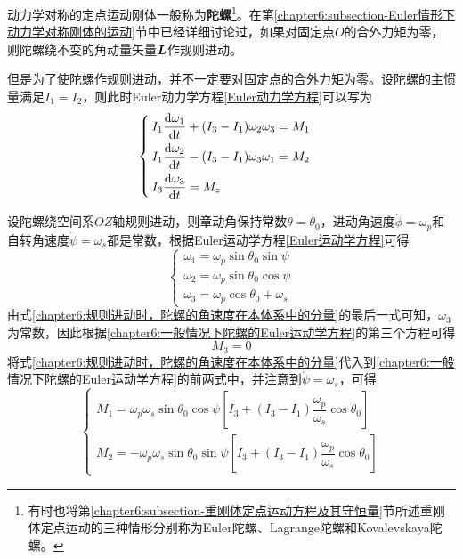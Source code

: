 
动力学对称的定点运动刚体一般称为{\bf 陀螺}\footnote{有时也将第\ref{chapter6:subsection-重刚体定点运动方程及其守恒量}节所述重刚体定点运动的三种情形分别称为Euler陀螺、Lagrange陀螺和Kovalevskaya陀螺。}。在第\ref{chapter6:subsection-Euler情形下动力学对称刚体的运动}节中已经详细讨论过，如果对固定点$O$的合外力矩为零，则陀螺绕不变的角动量矢量$\boldsymbol{L}$作规则进动。

但是为了使陀螺作规则进动，并不一定要对固定点的合外力矩为零。设陀螺的主惯量满足$I_1=I_2$，则此时Euler动力学方程\eqref{Euler动力学方程}可以写为
\begin{equation}
\begin{cases}
	I_1\dfrac{\mathrm{d} \omega_1}{\mathrm{d} t}+(I_3-I_1)\omega_2\omega_3=M_1 \\[1.5ex]
	I_1\dfrac{\mathrm{d} \omega_2}{\mathrm{d} t}-(I_3-I_1)\omega_3\omega_1=M_2 \\[1.5ex]
	I_3\dfrac{\mathrm{d} \omega_3}{\mathrm{d} t}=M_z
\end{cases}
\label{chapter6:一般情况下陀螺的Euler运动学方程}
\end{equation}

设陀螺绕空间系$OZ$轴规则进动，则章动角保持常数$\theta=\theta_0$，进动角速度$\dot{\phi}=\omega_p$和自转角速度$\dot{\psi}=\omega_s$都是常数，根据Euler运动学方程\eqref{Euler运动学方程}可得
\begin{equation}
\begin{cases}
	\omega_1=\omega_p\sin\theta_0\sin\psi \\
	\omega_2=\omega_p\sin\theta_0\cos\psi \\
	\omega_3=\omega_p\cos\theta_0+\omega_s
\end{cases}
\label{chapter6:规则进动时，陀螺的角速度在本体系中的分量}
\end{equation}
由式\eqref{chapter6:规则进动时，陀螺的角速度在本体系中的分量}的最后一式可知，$\omega_3$为常数，因此根据\eqref{chapter6:一般情况下陀螺的Euler运动学方程}的第三个方程可得
\begin{equation}
	M_3=0
	\label{chapter6:规则进动时，陀螺所受合外力矩的z分量}
\end{equation}
将式\eqref{chapter6:规则进动时，陀螺的角速度在本体系中的分量}代入到\eqref{chapter6:一般情况下陀螺的Euler运动学方程}的前两式中，并注意到$\dot{\psi}=\omega_s$，可得
\begin{equation}
\begin{cases}
	M_1=\omega_p\omega_s\sin\theta_0\cos\psi\left[I_3+(I_3-I_1)\dfrac{\omega_p}{\omega_s}\cos\theta_0\right] \\[1.5ex]
	M_2=-\omega_p\omega_s\sin\theta_0\sin\psi\left[I_3+(I_3-I_1)\dfrac{\omega_p}{\omega_s}\cos\theta_0\right]
\end{cases}
\label{chapter6:规则进动时，陀螺所受合外力矩的x和y分量}
\end{equation}

